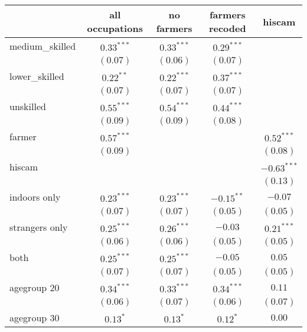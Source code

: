 
\begin{table}
\begin{center}
\begin{tabular}{l c c c c}
\hline
 & all occupations & no farmers & farmers recoded & hiscam \\
\hline
medium\_skilled & $0.33^{***}$  & $0.33^{***}$  & $0.29^{***}$  &               \\
                & $(0.07)$      & $(0.06)$      & $(0.07)$      &               \\
lower\_skilled  & $0.22^{**}$   & $0.22^{***}$  & $0.37^{***}$  &               \\
                & $(0.07)$      & $(0.07)$      & $(0.07)$      &               \\
unskilled       & $0.55^{***}$  & $0.54^{***}$  & $0.44^{***}$  &               \\
                & $(0.09)$      & $(0.09)$      & $(0.08)$      &               \\
farmer          & $0.57^{***}$  &               &               & $0.52^{***}$  \\
                & $(0.09)$      &               &               & $(0.08)$      \\
hiscam          &               &               &               & $-0.63^{***}$ \\
                &               &               &               & $(0.13)$      \\
indoors only    & $0.23^{***}$  & $0.23^{***}$  & $-0.15^{**}$  & $-0.07$       \\
                & $(0.07)$      & $(0.07)$      & $(0.05)$      & $(0.05)$      \\
strangers only  & $0.25^{***}$  & $0.26^{***}$  & $-0.03$       & $0.21^{***}$  \\
                & $(0.06)$      & $(0.06)$      & $(0.05)$      & $(0.05)$      \\
both            & $0.25^{***}$  & $0.25^{***}$  & $-0.05$       & $0.05$        \\
                & $(0.07)$      & $(0.07)$      & $(0.05)$      & $(0.05)$      \\
agegroup 20     & $0.34^{***}$  & $0.33^{***}$  & $0.34^{***}$  & $0.11$        \\
                & $(0.06)$      & $(0.07)$      & $(0.06)$      & $(0.07)$      \\
agegroup 30     & $0.13^{*}$    & $0.13^{*}$    & $0.12^{*}$    & $0.00$        \\

\end{tabular}
\end{center}
\end{table}
